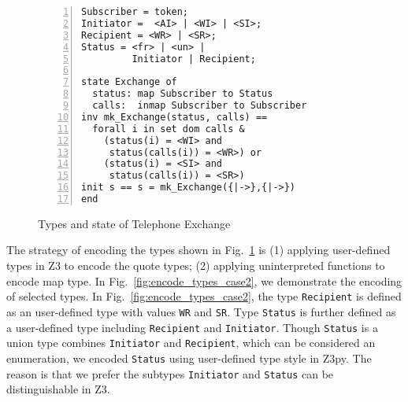 \begin{figure}[t]
\begin{center}
\begin{mdframed}[roundcorner=5pt]
\begin{Verbatim}[fontsize=\small,numbers=left]
Subscriber = token;
Initiator =  <AI> | <WI> | <SI>;
Recipient = <WR> | <SR>;
Status = <fr> | <un> |
         Initiator | Recipient;

state Exchange of
  status: map Subscriber to Status
  calls:  inmap Subscriber to Subscriber
inv mk_Exchange(status, calls) == 
  forall i in set dom calls & 
    (status(i) = <WI> and
     status(calls(i)) = <WR>) or
    (status(i) = <SI> and
     status(calls(i)) = <SR>)
init s == s = mk_Exchange({|->},{|->})
end
\end{Verbatim}
\end{mdframed}
\vspace{-10pt}
\caption{Types and state of Telephone Exchange}
\label{fig:types_case2}
\end{center}
\vspace{-20pt}
\end{figure}

The strategy of encoding the types shown in Fig.~\ref{fig:types_case2} is (1) applying user-defined types in Z3 to encode the quote types; (2) applying uninterpreted functions to encode map type. In Fig.~\ref{fig:encode_types_case2}, we demonstrate the encoding of selected types. In Fig.~\ref{fig:encode_types_case2}, the type {\tt Recipient} is defined as an user-defined type with values {\tt WR} and {\tt SR}. Type {\tt Status} is further defined as a user-defined type including {\tt Recipient} and {\tt Initiator}. Though {\tt Status} is a union type combines {\tt Initiator} and {\tt Recipient}, which can be considered an enumeration, we encoded {\tt Status} using user-defined type style in Z3py. The reason is that we prefer the subtypes {\tt Initiator} and {\tt Status} can be distinguishable in Z3.

